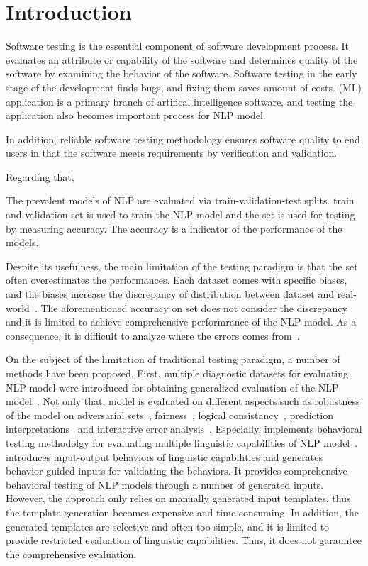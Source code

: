 \section{Introduction}
\label{sec:intro}

Software testing is the essential component of software development
process.  It evaluates an attribute or capability of the software and
determines quality of the software by examining the behavior of the
software.  Software testing in the early stage of the development
finds bugs, and fixing them saves amount of costs. \Ml (ML) application is a
primary branch of artifical intelligence software, and testing the application
also becomes important process for NLP model.

In addition, reliable software testing methodology ensures software
quality to end users in that the software meets requirements by
verification and validation.


Regarding that, 

The prevalent models of NLP are evaluated via train-validation-test
splits. train and validation set is used to train the NLP model and
the \ho set is used for testing by measuring accuracy. The accuracy is
a indicator of the performance of the models.

Despite its usefulness, the main limitation of the testing paradigm
is that the \ho set often overestimates the performances. Each dataset
comes with specific biases, and the biases increase the discrepancy of
distribution between dataset and
real-world~\cite{recht2019imagenetbias}. The aforementioned accuracy
on \ho set does not consider the discrepancy and it is limited to
achieve comprehensive performrance of the NLP model. As a consequence,
it is difficult to analyze where the errors comes
from~\cite{wu2019errudite}.

On the subject of the limitation of traditional testing paradigm, a
number of methods have been proposed. First, multiple diagnostic
datasets for evaluating NLP model were introduced for obtaining
generalized evaluation of the NLP model~\cite{wang2018glue}. Not only
that, model is evaluated on different aspects such as robustness of
the model on adversarial
sets~\cite{ribeiro2018sear,belinkov2018breaknmt,
  rychalska2019wildnlp,iyyer2018adversarial},
fairness~\cite{prabhakaran2019fairness,rottger2020hatecheck}, logical
consistancy~\cite{ribeiro2019consistencyeval}, prediction
interpretations~\cite{ribeiroSG16lime} and interactive error
analysis~\cite{wu2019errudite}. Especially, \Chlst implements
behavioral testing methodolgy for evaluating multiple linguistic
capabilities of NLP model~\cite{marcoACL2020checklist}. \Chlst
introduces input-output behaviors of linguistic capabilities and
generates behavior-guided inputs for validating the behaviors. It
provides comprehensive behavioral testing of NLP models through a
number of generated inputs. However, the approach only relies on
manually generated input templates, thus the template generation
becomes expensive and time consuming. In addition, the generated
templates are selective and often too simple, and it is limited to
provide restricted evaluation of linguistic capabilities. Thus, it
does not garauntee the comprehensive evaluation.

